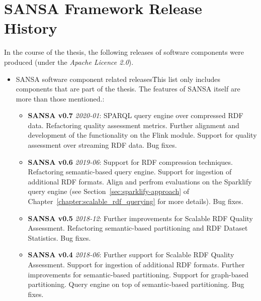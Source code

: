 \chapter{SANSA Framework Release History}
\label{sec:appendix-sansa-releases}

In the course of the thesis, the following releases of software components were produced (under the \textit{Apache Licence 2.0}).

\begin{itemize}
    \item SANSA software component related releases\f{This list only includes components that are part of the thesis. 
    The features of SANSA itself are more than those mentioned.}:
    \begin{itemize}
        
        \item \textbf{SANSA v0.7} \textit{2020-01}:
        SPARQL query engine over compressed RDF data.
        Refactoring quality assessment metrics.
        Further alignment and development of the functionality on the Flink module.
        Support for quality assessment over streaming RDF data.
        Bug fixes.
        
        \item \textbf{SANSA v0.6} \textit{2019-06}:
        Support for RDF compression techniques.
        Refactoring semantic-based query engine.
        Support for ingestion of additional RDF formats.
        Align and perfrom evaluations on the Sparklify query engine (see Section~\ref{sec:sparklify-approach} of Chapter~\ref{chapter:scalable_rdf_querying} for more details).
        Bug fixes.
        
        \item \textbf{SANSA v0.5} \textit{2018-12}: 
        Further improvements for Scalable RDF Quality Assessment. 
        Refactoring semantic-based partitioning and RDF Dataset Statistics.
        Bug fixes.
        
        \item \textbf{SANSA v0.4} \textit{2018-06}:
        Further support for Scalable RDF Quality Assessment. 
        Support for ingestion of additional RDF formats.
        Further improvements for semantic-based partitioning.
        Support for graph-based partitioning.
        Query engine on top of semantic-based partitioning.
        Bug fixes.
        

\end{itemize}
\end{itemize}
